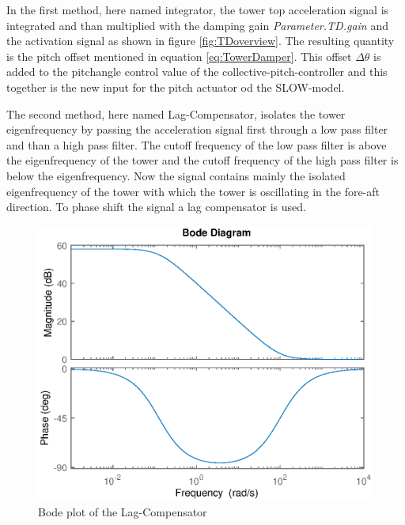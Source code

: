 In the first method, here named integrator, the tower top acceleration signal is integrated and than multiplied with the damping gain \textit{Parameter.TD.gain} and the activation signal as shown in figure \ref{fig:TDoverview}. The resulting quantity is the pitch offset mentioned in equation \ref{eq:TowerDamper}. This offset $\Delta\theta$ is added to the pitchangle control value of the collective-pitch-controller and this together is the new input for the pitch actuator od the SLOW-model.

The second method, here named Lag-Compensator, isolates the tower eigenfrequency by passing the acceleration signal first through a low pass filter and than a high pass filter. The cutoff frequency of the low pass filter is above the eigenfrequency of the tower and the cutoff frequency of the high pass filter is below the eigenfrequency. Now the signal contains mainly the isolated eigenfrequency of the tower with which the tower is oscillating in the fore-aft direction. To phase shift the signal a lag compensator is used. 
\begin{figure}[tbh]
	\centering	
	\includegraphics[width=12cm]{Figures/BodeLagCompensator.eps}
	\caption{Bode plot of the Lag-Compensator}
	\label{fig:BodeLag}
\end{figure} 

